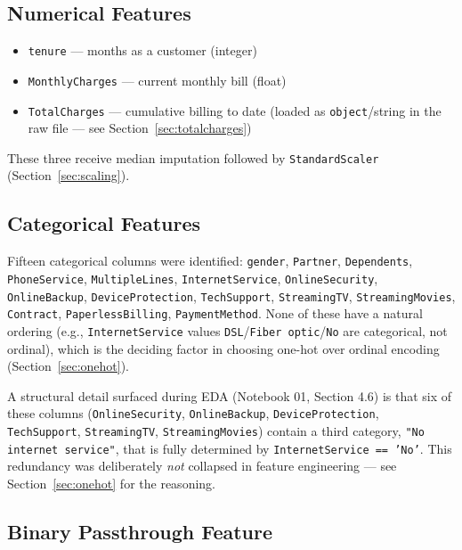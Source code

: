 \documentclass[11pt]{article}
\newcommand{\artifact}[1]{\texttt{\color{navy}#1}}
\begin{document}
\subsection{Numerical Features}

\begin{itemize}[leftmargin=1.4em]
    \item \artifact{tenure} --- months as a customer (integer)
    \item \artifact{MonthlyCharges} --- current monthly bill (float)
    \item \artifact{TotalCharges} --- cumulative billing to date (loaded as \texttt{object}/string in the raw file --- see Section~\ref{sec:totalcharges})
\end{itemize}

These three receive median imputation followed by \texttt{StandardScaler} (Section~\ref{sec:scaling}).

\subsection{Categorical Features}

Fifteen categorical columns were identified: \artifact{gender}, \artifact{Partner}, \artifact{Dependents}, \artifact{PhoneService}, \artifact{MultipleLines}, \artifact{InternetService}, \artifact{OnlineSecurity}, \artifact{OnlineBackup}, \artifact{DeviceProtection}, \artifact{TechSupport}, \artifact{StreamingTV}, \artifact{StreamingMovies}, \artifact{Contract}, \artifact{PaperlessBilling}, \artifact{PaymentMethod}. None of these have a natural ordering (e.g., \artifact{InternetService} values \texttt{DSL}/\texttt{Fiber optic}/\texttt{No} are categorical, not ordinal), which is the deciding factor in choosing one-hot over ordinal encoding (Section~\ref{sec:onehot}).

A structural detail surfaced during EDA (Notebook 01, Section 4.6) is that six of these columns (\artifact{OnlineSecurity}, \artifact{OnlineBackup}, \artifact{DeviceProtection}, \artifact{TechSupport}, \artifact{StreamingTV}, \artifact{StreamingMovies}) contain a third category, \texttt{"No internet service"}, that is fully determined by \artifact{InternetService == 'No'}. This redundancy was deliberately \emph{not} collapsed in feature engineering --- see Section~\ref{sec:onehot} for the reasoning.

\subsection{Binary Passthrough Feature}
\end{document}
